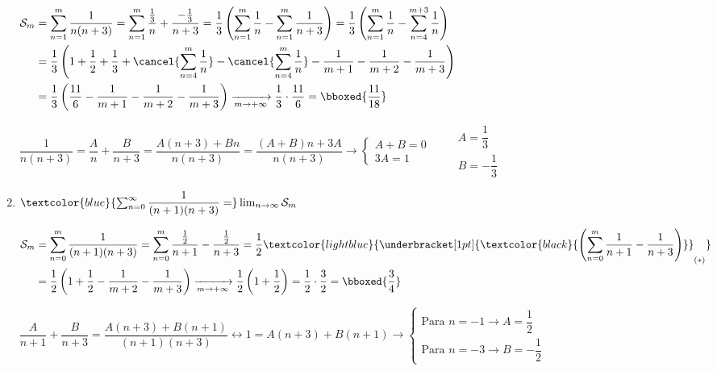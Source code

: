 \begin{enumerate}[label=\color{red}\alph*)]
	$\begin{aligned}
		\mathcal{S}_m&=\sum_{n=1}^{m}\dfrac{1}{n(n+3)}=\sum_{n=1}^{m}\dfrac{\frac{1}{3}}{n}+\dfrac{-\frac{1}{3}}{n+3}=\dfrac{1}{3}\left(\sum_{n=1}^{m}\dfrac{1}{n}-\sum_{n=1}^{m}\dfrac{1}{n+3}\right)=\dfrac{1}{3}\left(\sum_{n=1}^{m}\dfrac{1}{n}-\sum_{n=4}^{m+3}\dfrac{1}{n}\right)\\
		&=\dfrac{1}{3}\left(1+\dfrac{1}{2}+\dfrac{1}{3}+\cancel{\sum_{n=4}^{m}\dfrac{1}{n}}-\cancel{\sum_{n=4}^{m}\dfrac{1}{n}}-\dfrac{1}{m+1}-\dfrac{1}{m+2}-\dfrac{1}{m+3}\right)\\
		&=\dfrac{1}{3}\left(\dfrac{11}{6}-\dfrac{1}{m+1}-\dfrac{1}{m+2}-\dfrac{1}{m+3}\right)\xrightarrow[m\to+\infty]{}\dfrac{1}{3}\cdot\dfrac{11}{6}=\bboxed{\dfrac{11}{18}}
	\end{aligned}$
	
	$\dfrac{1}{n(n+3)}=\dfrac{A}{n}+\dfrac{B}{n+3}=\dfrac{A(n+3)+Bn}{n(n+3)}=\dfrac{(A+B)n+3A}{n(n+3)}\longrightarrow\left\{\begin{array}{l}
		A+B=0\\
		3A=1
	\end{array}\right.\qquad\boxed{\begin{array}{l}
			A=\dfrac{1}{3}\\
			B=-\dfrac{1}{3}
	\end{array}}$

	\item $\textcolor{blue}{\sum_{n=0}^{\infty}\dfrac{1}{(n+1)(n+3)}=}\lim_{n\to\infty}\mathcal{S}_m$
	
	$\begin{aligned}
		\mathcal{S}_m&=\sum_{n=0}^{m}\dfrac{1}{(n+1)(n+3)}=\sum_{n=0}^{m}\dfrac{\frac{1}{2}}{n+1}-\dfrac{\frac{1}{2}}{n+3}=\dfrac{1}{2}\textcolor{lightblue}{\underbracket[1pt]{\textcolor{black}{\left(\sum_{n=0}^{m}\dfrac{1}{n+1}-\dfrac{1}{n+3}\right)}}_{(\ast)}}\\
		&=\dfrac{1}{2}\left(1+\dfrac{1}{2}-\dfrac{1}{m+2}-\dfrac{1}{m+3}\right)\xrightarrow[m\to+\infty]{}\dfrac{1}{2}\left(1+\dfrac{1}{2}\right)=\dfrac{1}{2}\cdot\dfrac{3}{2}=\bboxed{\dfrac{3}{4}}
	\end{aligned}$
	
	$\dfrac{A}{n+1}+\dfrac{B}{n+3}=\dfrac{A(n+3)+B(n+1)}{(n+1)(n+3)}\longleftrightarrow1=A(n+3)+B(n+1)\longrightarrow\left\{\begin{array}{l}
		\text{Para }n=-1\longrightarrow A=\dfrac{1}{2}\\
		\text{Para }n=-3\longrightarrow B=-\dfrac{1}{2}
	\end{array}\right.$
	

\end{enumerate}
